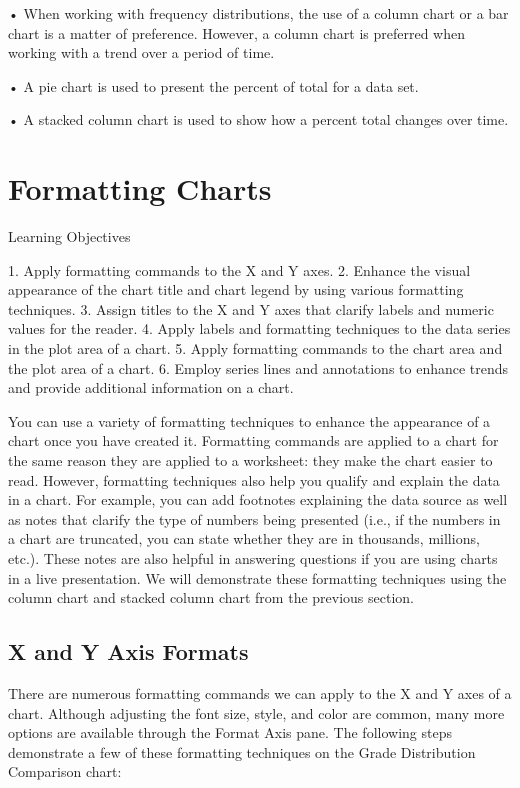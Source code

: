 • When working with frequency distributions, the use of a column chart or a bar chart is a matter of
preference. However, a column chart is preferred when working with a trend over a period of time.

• A pie chart is used to present the percent of total for a data set.

• A stacked column chart is used to show how a percent total changes over time.




\section{Formatting Charts}




Learning Objectives


1. Apply formatting commands to the X and Y axes.
2. Enhance the visual appearance of the chart title and chart legend by using various formatting techniques.
3. Assign titles to the X and Y axes that clarify labels and numeric values for the reader.
4. Apply labels and formatting techniques to the data series in the plot area of a chart.
5. Apply formatting commands to the chart area and the plot area of a chart.
6. Employ series lines and annotations to enhance trends and provide additional information on a chart.



You can use a variety of formatting techniques to enhance the appearance of a chart once you have
created it. Formatting commands are applied to a chart for the same reason they are applied to a
worksheet: they make the chart easier to read. However, formatting techniques also help you qualify
and explain the data in a chart. For example, you can add footnotes explaining the data source as
well as notes that clarify the type of numbers being presented (i.e., if the numbers in a chart are
truncated, you can state whether they are in thousands, millions, etc.). These notes are also helpful
in answering questions if you are using charts in a live presentation. We will demonstrate these
formatting techniques using the column chart and stacked column chart from the previous section.

\subsection{X and Y Axis Formats}

There are numerous formatting commands we can apply to the X and Y axes of a chart. Although
adjusting the font size, style, and color are common, many more options are available through the
Format Axis pane. The following steps demonstrate a few of these formatting techniques on the
Grade Distribution Comparison chart:

